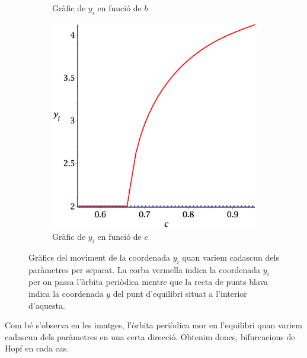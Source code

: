 \documentclass[a4paper]{article}
\theoremstyle{definition}
\begin{document}
\begin{figure}[ht]
\begin{subfigure}[b]{0.32\linewidth}
    \caption{Gràfic de $y_i$ en funció de $b$}
  \end{subfigure}
  \hfill
  \begin{subfigure}[b]{0.32\linewidth}
    \centering
    \includegraphics[width=\linewidth]{Images/ex2-c.eps}
    \caption{Gràfic de $y_i$ en funció de $c$}
  \end{subfigure}
  \caption{Gràfics del moviment de la coordenada $y_i$ quan variem cadascun dels paràmetres per separat. La corba vermella indica la coordenada $y_i$ per on passa l'òrbita periòdica mentre que la recta de punts blava indica la coordenada $y$ del punt d'equilibri situat a l'interior d'aquesta.}
\end{figure}

Com bé s'observa en les imatges, l'òrbita periòdica mor en l'equilibri quan variem cadascun dels paràmetres en una certa direcció. Obtenim doncs, bifurcacions de Hopf en cada cas.
\newpage
\end{document}
